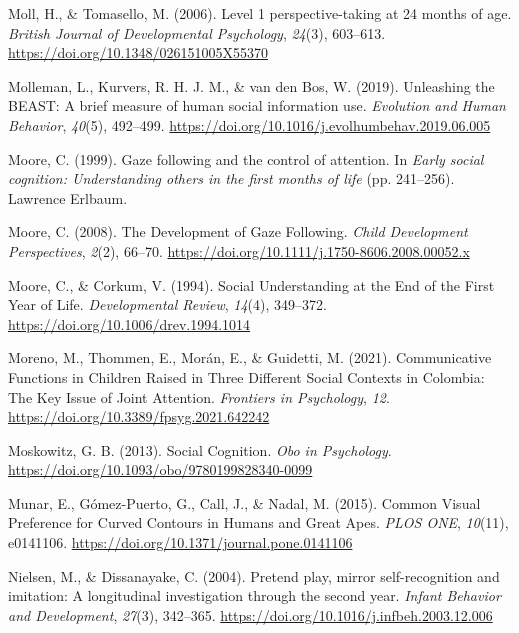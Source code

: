 \documentclass[
]{scrbook}
\newlength{\cslhangindent}
\newenvironment{CSLReferences}[2] %
 {\begin{list}{}{%
  \setlength{\itemindent}{0pt}
  \setlength{\leftmargin}{0pt}
  \setlength{\parsep}{0pt}
  \ifodd #1
   \setlength{\leftmargin}{\cslhangindent}
   \setlength{\itemindent}{-1\cslhangindent}
  \fi
  \setlength{\itemsep}{#2\baselineskip}}}
 {\end{list}}
\begin{document}
\begin{CSLReferences}{1}{0}
Moll, H., \& Tomasello, M. (2006). Level 1 perspective-taking at 24 months of age. \emph{British Journal of Developmental Psychology}, \emph{24}(3), 603--613. \url{https://doi.org/10.1348/026151005X55370}

Molleman, L., Kurvers, R. H. J. M., \& van den Bos, W. (2019). Unleashing the {BEAST}: A brief measure of human social information use. \emph{Evolution and Human Behavior}, \emph{40}(5), 492--499. \url{https://doi.org/10.1016/j.evolhumbehav.2019.06.005}

Moore, C. (1999). Gaze following and the control of attention. In \emph{Early social cognition: {Understanding} others in the first months of life} (pp. 241--256). Lawrence Erlbaum.

Moore, C. (2008). The {Development} of {Gaze Following}. \emph{Child Development Perspectives}, \emph{2}(2), 66--70. \url{https://doi.org/10.1111/j.1750-8606.2008.00052.x}

Moore, C., \& Corkum, V. (1994). Social {Understanding} at the {End} of the {First Year} of {Life}. \emph{Developmental Review}, \emph{14}(4), 349--372. \url{https://doi.org/10.1006/drev.1994.1014}

Moreno, M., Thommen, E., Morán, E., \& Guidetti, M. (2021). Communicative {Functions} in {Children Raised} in {Three Different Social Contexts} in {Colombia}: {The Key Issue} of {Joint Attention}. \emph{Frontiers in Psychology}, \emph{12}. \url{https://doi.org/10.3389/fpsyg.2021.642242}

Moskowitz, G. B. (2013). Social {Cognition}. \emph{Obo in Psychology}. \url{https://doi.org/10.1093/obo/9780199828340-0099}

Munar, E., Gómez-Puerto, G., Call, J., \& Nadal, M. (2015). Common {Visual Preference} for {Curved Contours} in {Humans} and {Great Apes}. \emph{PLOS ONE}, \emph{10}(11), e0141106. \url{https://doi.org/10.1371/journal.pone.0141106}

Nielsen, M., \& Dissanayake, C. (2004). Pretend play, mirror self-recognition and imitation: A longitudinal investigation through the second year. \emph{Infant Behavior and Development}, \emph{27}(3), 342--365. \url{https://doi.org/10.1016/j.infbeh.2003.12.006}


\end{CSLReferences}
\end{document}
